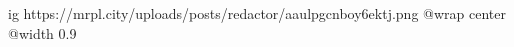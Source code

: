  
 
 
 
 

\ifcmt
  ig https://mrpl.city/uploads/posts/redactor/aaulpgcnboy6ektj.png
  @wrap center
  @width 0.9
\fi
